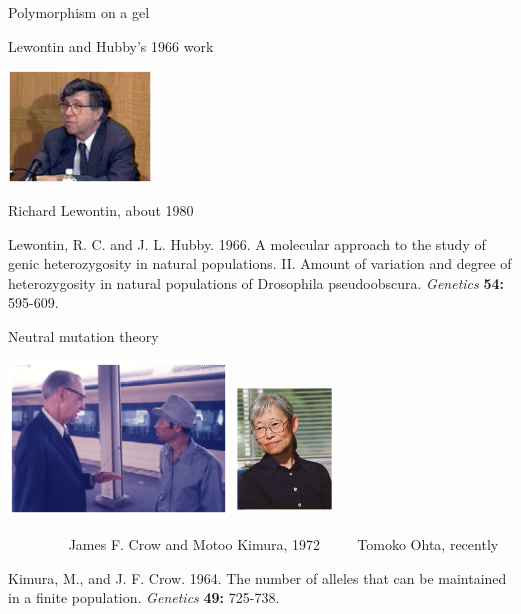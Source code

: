 \documentclass[bluish,slideColor,colorBG]{prosper}
\begin{document}
{\begin{slide}[Replace]{Polymorphism on a gel}
\end{slide}

\begin{slide}[Replace]{Lewontin and Hubby's 1966 work}

\centerline{\includegraphics[width=1.5in]{lewontin.ps}}

\noindent
\centerline{Richard Lewontin, about 1980}
\bigskip

\noindent
Lewontin, R. C.  and J. L. Hubby.  1966.  A molecular approach to the study of genic heterozygosity in natural populations. II. Amount of variation and degree of heterozygosity in natural populations of Drosophila pseudoobscura.
{\it Genetics} {\bf 54:} 595-609.

\end{slide}

\begin{slide}[Replace]{Neutral mutation theory}

\hspace*{0in} \hfill \includegraphics[width=2.3in]{CrowKimura72sm.ps} \hfill \includegraphics[width=1.07in]{ohta.ps} \hfill  {~~}

~~~~~~~~ James F. Crow and Motoo Kimura, 1972 ~~~~ Tomoko Ohta, recently
\bigskip

{\parindent=-15pt
Kimura, M., and J. F. Crow. 1964.  The number of alleles that can be maintained in a finite population. {\it Genetics} {\bf 49:} 725-738.

}
\end{slide}}
\end{document}

